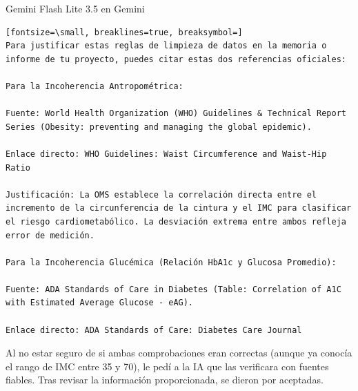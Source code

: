 \documentclass[12pt,a4paper,oneside]{book}
\begin{document}
\begin{iaresp}{Gemini Flash Lite 3.5 en Gemini}
\begin{Verbatim}[fontsize=\small, breaklines=true, breaksymbol=]
Para justificar estas reglas de limpieza de datos en la memoria o informe de tu proyecto, puedes citar estas dos referencias oficiales:

Para la Incoherencia Antropométrica:

Fuente: World Health Organization (WHO) Guidelines & Technical Report Series (Obesity: preventing and managing the global epidemic).

Enlace directo: WHO Guidelines: Waist Circumference and Waist-Hip Ratio

Justificación: La OMS establece la correlación directa entre el incremento de la circunferencia de la cintura y el IMC para clasificar el riesgo cardiometabólico. La desviación extrema entre ambos refleja error de medición.

Para la Incoherencia Glucémica (Relación HbA1c y Glucosa Promedio):

Fuente: ADA Standards of Care in Diabetes (Table: Correlation of A1C with Estimated Average Glucose - eAG).

Enlace directo: ADA Standards of Care: Diabetes Care Journal
\end{Verbatim}
\end{iaresp}
\begin{iaanalisis}
Al no estar seguro de si ambas comprobaciones eran correctas (aunque ya conocía el rango de IMC entre 35 y 70), le pedí a la IA que las verificara con fuentes fiables. Tras revisar la información proporcionada, se dieron por aceptadas.
\end{iaanalisis}
\end{document}
